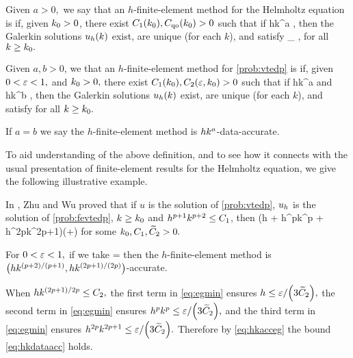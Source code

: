 \label{def:hkqo}
Given $a > 0,$ we say that an $h$-finite-element method for the Helmholtz equation is  if, given $k_{0} > 0$, there exist $C_{1}(k_{0}), C_{\mathrm{qo}}(k_{0}) > 0$ such that if
\beqs
hk^{a} \leq \Co,
\eeqs
then the Galerkin solutions $u_{h}(k)$ exist, are unique (for each $k$), and satisfy
\beqs
{} \leq \Cqo \inf_{\vh \in \Vhp} ,
\eeqs
for all $k \geq k_{0}.$
\ede

\label{def:hkdataacc}
Given $a,b>0$, we that an $h$-finite-element method for \cref{prob:vtedp} is  if, given $0 < \varepsilon < 1,$ and $k_{0} > 0,$ there exist $C_{1}(k_{0}), C_{2}(\varepsilon,k_{0}) > 0$ such that if
\beq\label{eq:hkdataacca}
hk^a \leq \Co
\eeq
and
\beq\label{eq:hkdataaccb}
hk^b \leq \Ct,
\eeq
then the Galerkin solutions $u_{h}(k)$ exist, are unique (for each $k$), and satisfy
\beq\label{eq:hkdataacc}
 \leq \eps \quad \tor \quad {} \leq \eps
\eeq
for all $k \geq k_{0}.$

If $a=b$ we say the $h$-finite-element method is $hk^{a}$-data-accurate.
\ede

To aid understanding of the above definition, and to see how it connects with the usual presentation of finite-element results for the Helmholtz equation, we give the following illustrative example.

\label{rem:dataacc}
In \cite[Corollary 4.2]{ZhWu:13}, Zhu and Wu proved that if $u$ is the solution of \cref{prob:vtedp}, $u_{h}$ is the solution of \cref{prob:fevtedp}, $k \geq k_{0}$ and $h^{p+1}k^{p+2} \leq C_{1}$,  then
\beq\label{eq:hkacceg}
 \leq \Cttilde \mleft(h + h^pk^p + h^{2p}k^{2p+1}\mright)\mleft(+\NHhGI{\gI}\mright)
\eeq
for some $k_{0}, C_{1}, \widetilde{C}_{2} > 0.$

For $0 < \varepsilon < 1,$ if we take
\beq\label{eq:egmin}
\Ct = \min{}
\eeq
then the $h$-finite-element method is $\hk{(p+2)/(p+1)}{(2p+1)/(2p)}$-accurate.

When $hk^{(2p+1)/2p} \leq C_{2},$ the first term in \cref{eq:egmin} ensures $h \leq \eps/\mleft(3\Cttilde\mright),$ the second term in \cref{eq:egmin} ensures $h^pk^p \leq \eps/\mleft(3\Cttilde\mright),$ and the third term in \cref{eq:egmin} ensures $h^{2p}k^{2p+1} \leq \eps/\mleft(3\Cttilde\mright).$ Therefore by \cref{eq:hkacceg} the bound \cref{eq:hkdataacc} holds.


